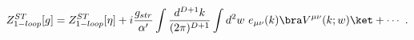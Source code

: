 \begin{equation}
  Z^{ST}_{1-loop} [g] =
   Z^{ST}_{1-loop} [\eta ] +
  i\frac{g_{str}}{\alpha'} \int \frac{d^{D+1}k}{(2\pi)^{D+1}}\int d^2w~e_{\mu\nu}(k)
  \bra V^{\mu\nu}(k;w) \ket +\cdots \ .
\label{Z}
\end{equation}

